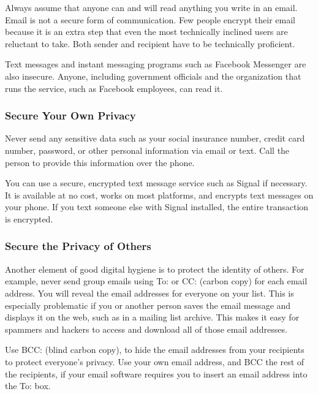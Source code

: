 \documentclass[
  letterpaper,
  DIV=11,
  numbers=noendperiod]{scrreprt}
\begin{document}
Always assume that anyone can and will read anything you write in an
email. Email is not a secure form of communication. Few people encrypt
their email because it is an extra step that even the most technically
inclined users are reluctant to take. Both sender and recipient have to
be technically proficient.

Text messages and instant messaging programs such as Facebook Messenger
are also insecure. Anyone, including government officials and the
organization that runs the service, such as Facebook employees, can read
it.

\subsubsection*{Secure Your Own Privacy}\label{secure-your-own-privacy}

Never send any sensitive data such as your social insurance number,
credit card number, password, or other personal information via email or
text. Call the person to provide this information over the phone.

You can use a secure, encrypted text message service such as Signal if
necessary. It is available at no cost, works on most platforms, and
encrypts text messages on your phone. If you text someone else with
Signal installed, the entire transaction is encrypted.

\subsubsection*{Secure the Privacy of
Others}\label{secure-the-privacy-of-others}

Another element of good digital hygiene is to protect the identity of
others. For example, never send group emails using To: or CC: (carbon
copy) for each email address. You will reveal the email addresses for
everyone on your list. This is especially problematic if you or another
person saves the email message and displays it on the web, such as in a
mailing list archive. This makes it easy for spammers and hackers to
access and download all of those email addresses.

Use BCC: (blind carbon copy), to hide the email addresses from your
recipients to protect everyone's privacy. Use your own email address,
and BCC the rest of the recipients, if your email software requires you
to insert an email address into the To: box.
\end{document}
